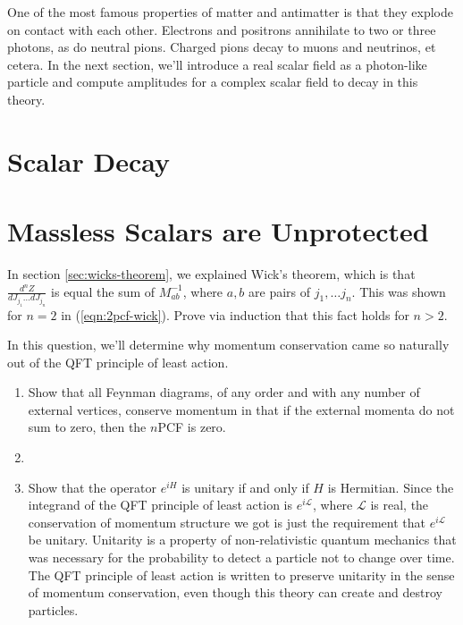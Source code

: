 One of the most famous properties of matter and antimatter is that they explode on contact with each other. Electrons and positrons annihilate to two or three photons, as do neutral pions. Charged pions decay to muons and neutrinos, et cetera. In the next section,  we'll introduce a real scalar field as a photon-like particle and compute amplitudes for a complex scalar field to decay in this theory.

\section{Scalar Decay}

\section{Massless Scalars are Unprotected}
\label{sec:scalar-mass}

\begin{problem}
  In section \ref{sec:wicks-theorem}, we explained Wick's theorem, which is that 
  $\frac{d^nZ}{d J_{j_1}\dots dJ_{j_n}}$ is equal the sum of $M^{-1}_{ab}$, where $a, b$ are pairs of $j_1,\dots j_n$. This was shown for $n=2$ in (\ref{eqn:2pcf-wick}). Prove via induction that this fact holds for $n>2$.
\end{problem}

\begin{problem}
  In this question, we'll determine why momentum conservation came so naturally out of the QFT principle of least action.
  \begin{enumerate}
    \item Show that all Feynman diagrams, of any order and with any number of external vertices, conserve momentum in that if the external momenta do not sum to zero, then the $n$PCF is zero.
    \item {}
    \item Show that the operator $e^{iH}$ is unitary if and only if $H$ is Hermitian. Since the integrand of the QFT principle of least action is $e^{i\mathcal{L}}$, where $\mathcal{L}$ is real, the conservation of momentum structure we got is just the requirement that $e^{i\mathcal{L}}$ be unitary. Unitarity is a property of non-relativistic quantum mechanics that was necessary for the probability to detect a particle not to change over time. The QFT principle of least action is written to preserve unitarity in the sense of momentum conservation, even though this theory can create and destroy particles.
  \end{enumerate}
\end{problem}

